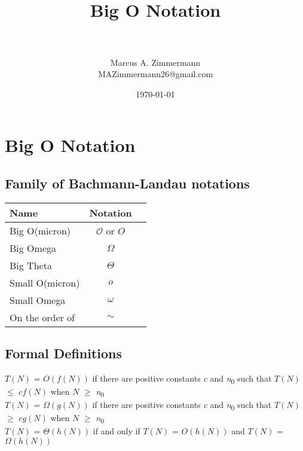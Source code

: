 \documentclass[letterpaper, 10pt,DIV=13]{scrartcl}
\title{	
   \normalfont \normalsize
   \horrule{0.5pt} \\[0.25cm] 	%
   \huge Big O Notation  \\     	    %
   \horrule{0.5pt} \\[0.25cm] 	%
}
\author{Marcus A. Zimmermann \\ \normalsize MAZimmermann26@gmail.com}
\date{\normalsize\today} 	%
\numberwithin{equation}{section} %
\numberwithin{figure}{section} %
\numberwithin{table}{section} %
\begin{document}
\maketitle %

\section*{Big O Notation}

\newcommand{\bslash}{\char`\\}
 
\subsection*{Family of Bachmann-Landau notations}
\setlength{\tabcolsep}{12pt}
\renewcommand*{\arraystretch}{1.2}
\begin{tabular}{lcl}
\hline
Name&Notation\\
\hline
{Big O(micron)}&$\mathcal{O}$ or $O$\\
{Big Omega}&$\Omega$\\
{Big Theta}&$\Theta$\\
{Small O(micron)}&$o$\\
{Small Omega}&$\omega$\\
{On the order of}&$\sim$\\
\hline
\end{tabular}

\subsection*{Formal Definitions}

$T(N)$ =  $O(f(N))$ if there are positive constants \textit{c} and \textit{n}\textsubscript{0} such 
that $T(N)$ $\leq$ $cf(N)$ when $N$ $\geq$ \textit{n}\textsubscript{0} \\

$T(N)$ =  $\Omega(g(N))$ if there are positive constants \textit{c} and \textit{n}\textsubscript{0} such 
that $T(N)$ $\geq$ $cg(N)$ when $N$ $\geq$ \textit{n}\textsubscript{0} \\

$T(N)$ =  $\Theta(h(N))$ if and only if $T(N)$ =  $O(h(N))$ and $T(N)$ =  $\Omega(h(N))$ \\
\end{document}
